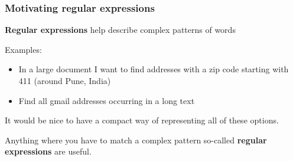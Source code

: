 %
%
%
%
%
%
%
%
%
%

 \begin{frame}[fragile]
\frametitle{Motivating regular expressions}

\textbf{Regular expressions} help describe complex patterns of words

Examples:

\begin{itemize}

 \item In a large document I want to find addresses with a zip code
   starting with 411 (around Pune, India)
\item Find all gmail addresses occurring in a long text
\end{itemize}

It would be nice to have a compact way of
    representing all of these options.

 Anything where you have to match a complex pattern so-called
     \textbf{regular expressions} are useful.
\end{frame}

